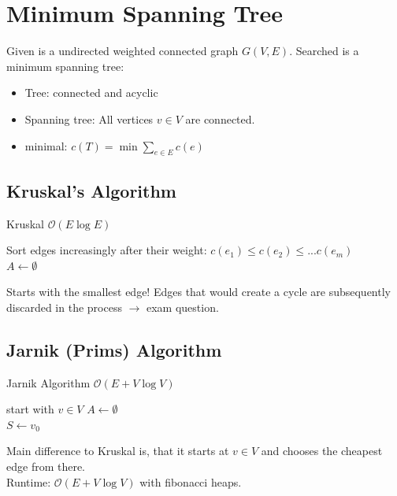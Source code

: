 \documentclass[9pt,landscape,a4paper, table]{extarticle}
\begin{document}
\begin{multicols*}{3}
\begin{itemize}
\end{itemize}

\section{Minimum Spanning Tree}
Given is a undirected weighted connected graph $G(V,E)$. Searched is a minimum spanning tree:
\begin{itemize}
    \item Tree: connected and acyclic
    \item Spanning tree: All vertices $v \in V$ are connected.
    \item minimal: $c(T) = \min \sum_{e \in E} c(e)$
\end{itemize}
\subsection{Kruskal's Algorithm}

{\scriptsize
\begin{algorithm}[H]
    \caption{Kruskal $\mathcal{O}(E \log E)$}
    
    \SetAlgoLined
    Sort edges increasingly after their weight:
    $c(e_1) \leq c(e_2) \leq... c(e_m)$\\
    $A \leftarrow \emptyset$
\end{algorithm}}
Starts with the smallest edge! Edges that would create a cycle are subsequently discarded in the process $\rightarrow$ exam question.\\

\subsection{Jarnik (Prims) Algorithm}
{\scriptsize
\begin{algorithm}[H]
    \caption{Jarnik Algorithm $\mathcal{O}(E + V \log V)$}
    
    \SetAlgoLined
    start with $v \in V$
    $A \leftarrow \emptyset$\\
    $S \leftarrow {v_0}$
\end{algorithm}}
Main difference to Kruskal is, that it starts at $v \in V$ and chooses the cheapest edge from there.\\
Runtime: $\mathcal{O}(E + V \log V)$ with fibonacci heaps.

\end{multicols*}
\end{document}
